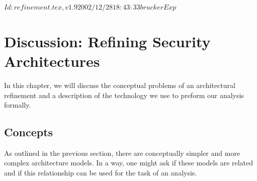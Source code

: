 \rcsInfo $Id: refinement.tex,v 1.9 2002/12/28 18:43:33 brucker Exp $

\chapter{Discussion: Refining Security Architectures}
In this chapter, we will discuss the conceptual problems of an architectural
refinement and a description of the technology we use to preform our analysis
formally.

\section{Concepts}
As outlined in the previous section, there are conceptually simpler and more
complex architecture models. In a way, one might ask if these models are related
and if this relationship can be used for the task of an analysis.

